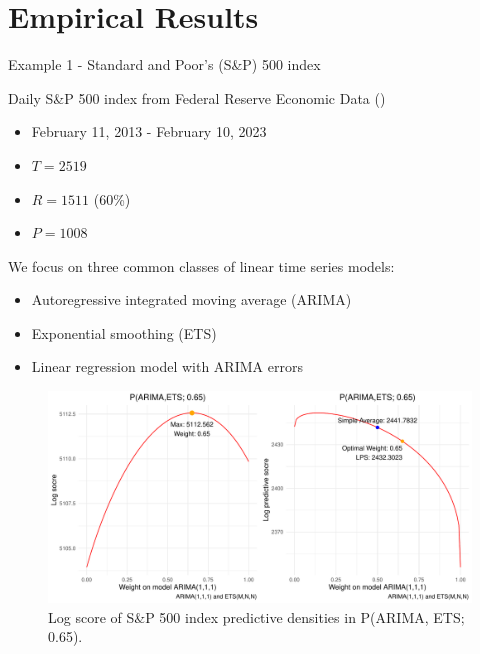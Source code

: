 
\section{Empirical Results}

\begin{frame}{Example 1 - Standard and Poor's (S\&P) 500 index}

    Daily S\&P 500 index from Federal Reserve Economic Data (\cite{SP500})

    \begin{itemize}
    \item February 11, 2013 - February 10, 2023
    \item $T = 2519$
    \item $R = 1511$ (60\%)
    \item $P = 1008$
    \end{itemize}

    \vspace{4mm}
    
    We focus on three common classes of linear time series models: 
    
    \begin{itemize}
    \item Autoregressive integrated moving average (ARIMA)
    \item Exponential smoothing (ETS)
    \item Linear regression model with ARIMA errors
    \end{itemize}

\end{frame}



\begin{frame}[plain]{}
\begin{figure}[ht]
\centering
\includegraphics[scale=0.55]{Graph/SP500_nonstat_1.pdf}
\caption{\footnotesize{Log score of S\&P 500 index predictive densities in P(ARIMA, ETS; 0.65).}}
\end{figure}
\end{frame}




